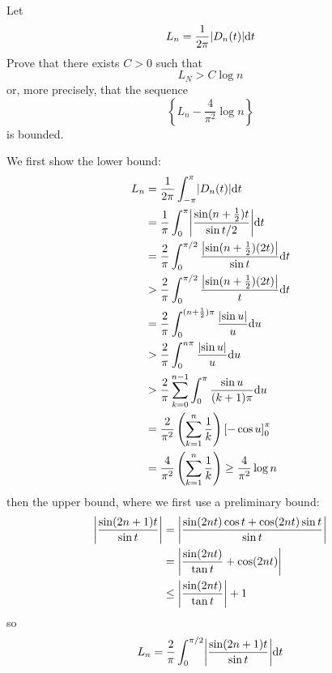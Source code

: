 \documentclass[a4paper, 12pt]{article}
\begin{document}
\begin{problem} 
Let \begin{equation*}
L_n = \frac{1}{2\pi} \abs{D_n(t)} \dt 
\end{equation*}
Prove that there exists $C > 0$ such that \begin{equation*}
L_N > C \log n
\end{equation*}
or, more precisely, that the sequence \begin{equation*}
\left\{L_n - \frac{4}{\pi^2} \log n \right\}
\end{equation*}
is bounded.
\end{problem}
\begin{solution}
    We first show the lower bound:
    \begin{align*}
        L_n &= \frac{1}{2\pi} \int_{-\pi}^{\pi} \abs*{D_n(t)} \dt \\
        &= \frac{1}{\pi} \int_{0}^{\pi} \abs*{\frac{\sin (n+\frac{1}{2}) t}{\sin t/2}}\dt\\
        &= \frac{2}{\pi} \int_{0}^{\pi/2} \frac{\abs*{\sin (n + \frac{1}{2})(2t)}}{\sin t} \dt \\
        &> \frac{2}{\pi} \int_{0}^{\pi/2} \frac{\abs*{\sin (n + \frac{1}{2})(2t)}}{t} \dt \\
        &= \frac{2}{\pi} \int_{0}^{(n+ \frac{1}{2}) \pi} \frac{\abs*{\sin u}}{u} \du \\
        &> \frac{2}{\pi} \int_{0}^{n\pi}\frac{\abs*{\sin u}}{u} \du \\
        &> \frac{2}{\pi} \sum_{k=0}^{n-1} \int_{0}^{\pi} \frac{\sin u}{(k+1) \pi} \du \\
        &= \frac{2}{\pi^2} \left(\sum_{k=1}^{n} \frac{1}{k}\right) \eval{-\cos u}{\pi}{0} \\
        &= \frac{4}{\pi^2} \left(\sum_{k=1}^{n} \frac{1}{k}\right) \geq \frac{4}{\pi^2} \log n
    \end{align*}
    then the upper bound, where we first use a preliminary bound:
    \begin{align*}
        \abs*{\frac{\sin (2n+1) t}{\sin t}} &= \abs*{\frac{\sin (2nt) \cos t + \cos (2nt) \sin t}{\sin t}} \\
        &= \abs*{\frac{\sin (2nt)}{\tan t} + \cos (2nt)} \\
        &\leq \abs*{\frac{\sin(2nt)}{\tan t}} + 1
    \end{align*}
    so
    \begin{align*}
            L_n &= \frac{2}{\pi} \int_{0}^{\pi/2} \abs*{\frac{\sin (2n+1) t}{\sin t}} \dt \\

\end{align*}
\end{solution}
\end{document}
